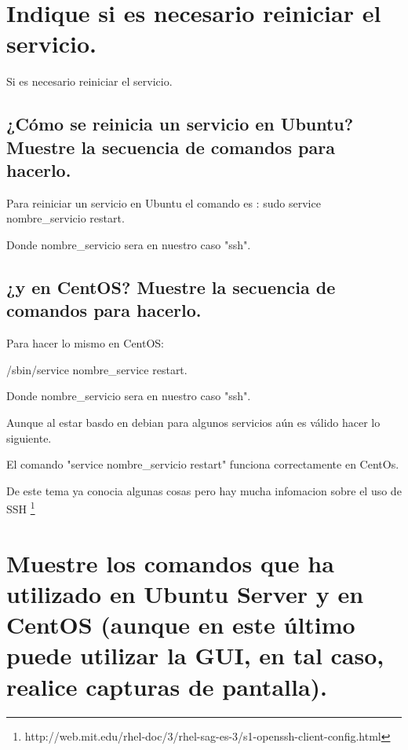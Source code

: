 \section{Indique si es necesario reiniciar el servicio.}

Si es necesario reiniciar el servicio.

\subsection{¿Cómo se reinicia un servicio en Ubuntu? Muestre la secuencia de comandos para hacerlo. }

Para reiniciar un servicio en Ubuntu el comando es : sudo service  nombre\_servicio restart.


Donde nombre\_servicio sera en nuestro caso "ssh".



\subsection{ ¿y en CentOS? Muestre la secuencia de comandos para hacerlo. }

Para hacer lo mismo en CentOS:

/sbin/service nombre\_service  restart.

Donde nombre\_servicio sera en nuestro caso "ssh".



Aunque al estar basdo en debian para algunos servicios aún es válido hacer lo siguiente.

El comando "service nombre\_servicio restart" funciona correctamente en CentOs.

De este tema ya conocia algunas cosas pero hay mucha infomacion sobre el uso de SSH \footnote{http://web.mit.edu/rhel-doc/3/rhel-sag-es-3/s1-openssh-client-config.html}






\section{ Muestre los comandos que ha utilizado en Ubuntu Server y en CentOS (aunque en este último puede utilizar la GUI, en tal caso, realice capturas de pantalla).}


